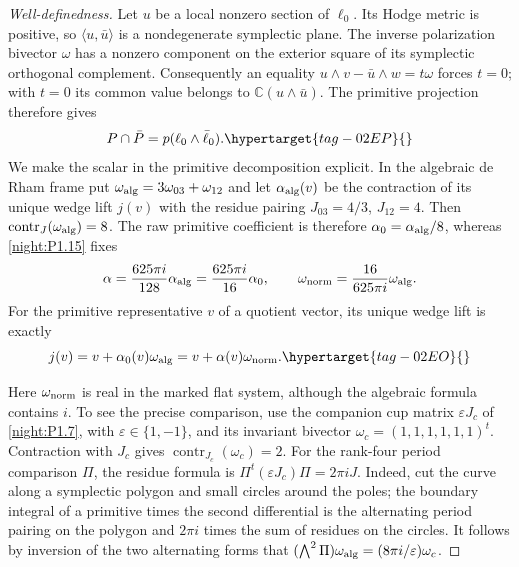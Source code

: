 \begin{proof}[Well-definedness]
Let $u$ be a local nonzero section of $\ell_0$.
Its Hodge metric is positive, so $\langle u,\bar u\rangle$
is a nondegenerate symplectic plane. The inverse polarization
bivector $\omega$ has a nonzero component on the exterior square
of its symplectic orthogonal complement. Consequently an equality
$u\wedge v-\bar u\wedge w=t\omega$ forces $t=0$; with $t=0$
its common value belongs to $\mathbb C(u\wedge\bar u)$.
The primitive projection therefore gives
\begin{equation}
 P\cap\bar P=p(\ell_0\wedge\bar\ell_0).
 \hypertarget{tag-02EP}{}\label{maps:eq:F.19}
\end{equation}
We make the scalar in the primitive decomposition explicit.
In the algebraic de Rham frame put
$\omega_{\rm alg}=3\omega_{03}+\omega_{12}$ and let
$\alpha_{\rm alg}(v)$ be the contraction of its unique wedge
lift $j(v)$ with the residue pairing $J_{03}=4/3$, $J_{12}=4$. Then
$\operatorname{contr}_{J}(\omega_{\rm alg})=8$. The raw primitive
coefficient is therefore $\alpha_0=\alpha_{\rm alg}/8$, whereas
\cref{night:P1.15} fixes
\[
 \alpha=\frac{625\pi i}{128}\alpha_{\rm alg}
        =\frac{625\pi i}{16}\alpha_0,
 \qquad
 \omega_{\rm norm}=\frac{16}{625\pi i}\omega_{\rm alg}.
\]
For the primitive representative $v$ of a quotient vector, its
unique wedge lift is exactly
\begin{equation}
 j(v)=v+\alpha_0(v)\omega_{\rm alg}
     =v+\alpha(v)\omega_{\rm norm}.
 \hypertarget{tag-02EO}{}\label{maps:eq:F.18}
\end{equation}

Here $\omega_{\rm norm}$ is real in the marked flat system,
although the algebraic formula contains $i$. To see the precise
comparison, use the companion cup matrix $\varepsilon J_c$ of
\cref{night:P1.7}, with $\varepsilon\in\{1,-1\}$, and its
invariant bivector $\omega_c=(1,1,1,1,1,1)^t$.
Contraction with $J_c$ gives $\operatorname{contr}_{J_c}(\omega_c)=2$.
For the rank-four period comparison $\Pi$, the residue formula is
$\Pi^t(\varepsilon J_c)\Pi=2\pi iJ$.
Indeed, cut the curve along a symplectic polygon and small circles
around the poles; the boundary integral of a primitive times the
second differential is the alternating period pairing on the
polygon and $2\pi i$ times the sum of residues on the circles.
It follows by inversion of the two alternating forms that
$(\bigwedge^2\Pi)\omega_{\rm alg}=(8\pi i/\varepsilon)\omega_c$.


\end{proof}
